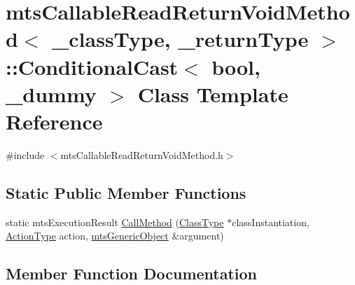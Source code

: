 \hypertarget{classmts_callable_read_return_void_method_1_1_conditional_cast}{}\section{mts\+Callable\+Read\+Return\+Void\+Method$<$ \+\_\+class\+Type, \+\_\+return\+Type $>$\+:\+:Conditional\+Cast$<$ bool, \+\_\+dummy $>$ Class Template Reference}
\label{classmts_callable_read_return_void_method_1_1_conditional_cast}


{\ttfamily \#include $<$mts\+Callable\+Read\+Return\+Void\+Method.\+h$>$}

\subsection*{Static Public Member Functions}
\begin{DoxyCompactItemize}
\item 
static mts\+Execution\+Result \hyperlink{classmts_callable_read_return_void_method_1_1_conditional_cast_a99e4807f8515f7509d9816f1da2901c1}{Call\+Method} (\hyperlink{classmts_callable_read_return_void_method_a694e26a4c7fc28f0c739aa2f2ab97e12}{Class\+Type} $\ast$class\+Instantiation, \hyperlink{classmts_callable_read_return_void_method_a97673cc9242251e406bde738cb060781}{Action\+Type} action, \hyperlink{classmts_generic_object}{mts\+Generic\+Object} \&argument)
\end{DoxyCompactItemize}


\subsection{Member Function Documentation}
\hypertarget{classmts_callable_read_return_void_method_1_1_conditional_cast_a99e4807f8515f7509d9816f1da2901c1}{}
